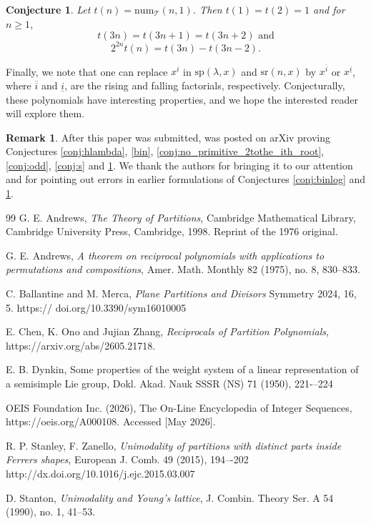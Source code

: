 \documentclass[reqno]{amsart}
\def\sp{\mathrm{sp}}
\def\sr{\mathrm{sr}}
\def\num{\mathrm{num}}
\newtheorem{conjecture}{Conjecture}
\theoremstyle{definition}
\newtheorem{remark}{Remark}
\begin{document}
\begin{conjecture}\label{conj:t}
Let $t(n) = \num_\mathcal{T}(n,1)$. Then $t(1)=t(2)=1$ and for $n\geq 1$, 
\[
t(3n)=t(3n+1)=t(3n+2) \mbox{ and}\] 
\[
2^{2n}t(n) = t(3n)-t(3n-2).\]
\end{conjecture}


Finally, we note that  one can replace $x^i$ in $\sp(\lambda,x)$ and $\sr(n,x)$ by $x^{\overline i}$ or $x^{\underline i}$, where $\overline i$ and  $\underline i$, are the rising and falling factorials, respectively.  Conjecturally, these polynomials have interesting properties, and we hope the interested reader will explore them. 

\begin{remark}
    After this paper was submitted, \cite{COZ} was posted on arXiv proving Conjectures \ref{conj:hlambda}, \ref{bin}, \ref{conj:no_primitive_2tothe_ith_root}, \ref{conj:odd}, \ref{conj:s} and \ref{conj:t}. We thank the authors for bringing it to our attention and for pointing out errors in  earlier formulations of Conjectures \ref{conj:binlog} and \ref{conj:t}. 
\end{remark}


\begin{thebibliography}{99}
 G. E. Andrews, 
 \textit{The Theory of Partitions}, 
 Cambridge Mathematical Library, Cambridge University Press, Cambridge, 1998. Reprint of the 1976 original.

 G. E. Andrews, 
\textit{A theorem on reciprocal polynomials with applications to permutations and compositions},
Amer. Math. Monthly 82 (1975), no. 8, 830--833. 



 C. Ballantine and M. Merca,
\textit{Plane Partitions and Divisors}
Symmetry 2024, 16, 5. https://
doi.org/10.3390/sym16010005

 E. Chen, K. Ono and Jujian Zhang,
\textit{Reciprocals of Partition Polynomials},
 {https://arxiv.org/abs/2605.21718}.


 E. B. Dynkin, Some properties of the weight system of a linear representation of a semisimple Lie group, Dokl. Akad. Nauk
SSSR (NS) 71 (1950), 221-–224 

OEIS Foundation Inc. (2026), The On-Line Encyclopedia of Integer Sequences, https://oeis.org/A000108. Accessed [May 2026].




R. P. Stanley, F. Zanello, \textit{Unimodality of partitions with distinct parts
inside Ferrers shapes}, European J. Comb. 49 (2015), 194–-202
{http://dx.doi.org/10.1016/j.ejc.2015.03.007}

 D. Stanton, \textit{Unimodality and Young's lattice}, J. Combin. Theory Ser. A 54 (1990), no. 1, 41--53.

\end{thebibliography}
\end{document}
